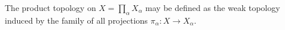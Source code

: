 The product topology on $X = \prod_{\alpha} X_{\alpha}$ may be defined as the weak topology induced by the family of all projections $\pi_{\alpha}: X \to X_{\alpha}$.
